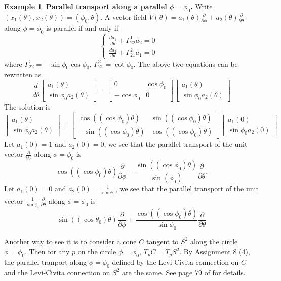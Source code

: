 \documentclass{amsart}
\numberwithin{equation}{section}
\theoremstyle{definition}
\newtheorem{example}[definition]{Example}
\theoremstyle{theorem}
\begin{document}
\begin{example}
\noindent
{\bf Parallel transport along a parallel $\phi=\phi_0$.}
Write $(x_1(\theta), x_2(\theta))= (\phi_0,\theta)$. A vector field 
$V(\theta)= a_1(\theta)\frac{\partial}{\partial\phi}+a_2(\theta)\frac{\partial}{\partial \theta}$
along $\phi=\phi_0$ is parallel if and only if
$$
\begin{cases}
\displaystyle{\frac{da_1}{d\theta} + \Gamma^1_{22}a_2 =0}&\\ 
\displaystyle{\frac{da_2}{d\theta}+ \Gamma_{21}^2 a_1 =0} &
\end{cases}
$$
where $\Gamma^1_{22}=-\sin\phi_0 \cos\phi_0$, $\Gamma_{21}^2 = \cot\phi_0$. 
The above two equations can be rewritten as
$$
\frac{d}{d\theta}\left[ \begin{array}{c} a_1(\theta)\\ \sin\phi_0 a_2(\theta)\end{array}\right]
=\left[ \begin{array}{cc} 0 & \cos\phi_0\\ -\cos\phi_0 &0 \end{array}\right]
 \left[ \begin{array}{c} a_1(\theta)\\ \sin\phi_0 a_2(\theta)\end{array}\right]
$$
The solution is 
\[
\begin{bmatrix}
a_1(\theta) \\ \sin\phi_0 a_2(\theta)
\end{bmatrix} = \begin{bmatrix}
\cos((\cos \phi_0)\theta) & \sin((\cos \phi_0)\theta) \\
- \sin((\cos \phi_0)\theta) & \cos((\cos \phi_0)\theta)
\end{bmatrix}\begin{bmatrix}
a_1(0) \\ \sin\phi_0a_2(0)
\end{bmatrix}
\]
Let $a_1(0)=1$ and $a_2(0)=0$, we see that the parallel transport of the unit vector $\frac{\partial}{\partial \phi}$ 
along $\phi=\phi_0$ is 
 \[
\cos((\cos\phi_0) \theta) \frac{\partial}{\partial \phi} 
- \frac{\sin((\cos \phi_0) \theta)}{\sin(\phi_0)}\frac{\partial}{\partial \theta}.
\]
Let $a_1(0)=0$ and  $a_2(0)=\frac{1}{\sin \phi_0}$, we see that  the
parallel transport of the unit vector $\frac{1}{\sin \phi_0} \frac{\partial}{\partial \theta}$ along $\phi = \phi_0$ is
\[
\sin((\cos \theta_0)\theta) \frac{\partial}{\partial \phi} + \frac{\cos((\cos \phi_0) \theta)}{\sin \phi_0} \frac{\partial}{\partial \theta}
\]


Another way to see it is to consider a cone $C$ tangent to $S^2$ along the circle $\phi=\phi_0$. 
Then for any $p$ on the circle $\phi=\phi_0$, $T_p C = T_p S^2$. 
By Assignment 8 (4), the parallel tranport along $\phi=\phi_0$ defined
by the Levi-Civita connection on $C$ and the Levi-Civita connection on $S^2$ are the same.
See page 79 of \cite{GHL} for details. 
\end{example}
\end{document}
